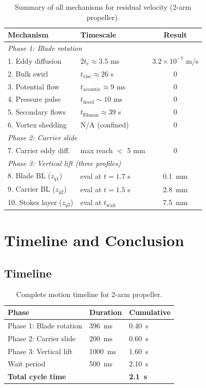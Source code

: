 \documentclass[11pt,a4paper]{article}
\begin{document}
\begin{table}[H]
\centering
\caption{Summary of all mechanisms for residual velocity (2-arm propeller).}
\label{tab:all_mechanisms}
\begin{tabular}{llc}
\toprule
Mechanism & Timescale & Result \\
\midrule
\multicolumn{3}{l}{\textit{Phase 1: Blade rotation}} \\
1. Eddy diffusion & $2t_e \approx 3.5$ ms & $3.2 \times 10^{-7}$ m/s \\
2. Bulk swirl & $t_\mathrm{visc} \approx 26$ s & 0 \\
3. Potential flow & $t_\mathrm{acoustic} \approx 9$ ms & 0 \\
4. Pressure pulse & $t_\mathrm{decel} \sim 10$ ms & 0 \\
5. Secondary flows & $t_\mathrm{Ekman} \approx 39$ s & 0 \\
6. Vortex shedding & N/A (confined) & 0 \\
\midrule
\multicolumn{3}{l}{\textit{Phase 2: Carrier slide}} \\
7. Carrier eddy diff. & max reach $<$ 5 mm & 0 \\
\midrule
\multicolumn{3}{l}{\textit{Phase 3: Vertical lift (three profiles)}} \\
8. Blade BL ($z_{q1}$) & eval at $t = 1.7$ s & \SI{0.1}{mm} \\
9. Carrier BL ($z_{q2}$) & eval at $t = 1.5$ s & \SI{2.8}{mm} \\
10. Stokes layer ($z_{q3}$) & eval at $t_\mathrm{wait}$ & \SI{7.5}{mm} \\
\bottomrule
\end{tabular}
\end{table}


\section{Timeline and Conclusion}
\label{sec:conclusion}

\subsection{Timeline}

\begin{table}[H]
\centering
\caption{Complete motion timeline for 2-arm propeller.}
\label{tab:timeline}
\begin{tabular}{lll}
\toprule
Phase & Duration & Cumulative \\
\midrule
Phase 1: Blade rotation & \SI{396}{ms} & \SI{0.40}{s} \\
Phase 2: Carrier slide & \SI{200}{ms} & \SI{0.60}{s} \\
Phase 3: Vertical lift & \SI{1000}{ms} & \SI{1.60}{s} \\
Wait period & \SI{500}{ms} & \SI{2.10}{s} \\
\midrule
\textbf{Total cycle time} & & \textbf{\SI{2.1}{s}} \\
\bottomrule
\end{tabular}
\end{table}
\end{document}
